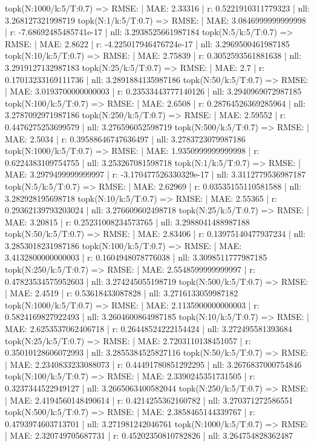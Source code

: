 topk(N:1000/k:5/T:0.7) => RMSE: | MAE: 2.33316 | r: 0.5221910311779323 | nll: 3.268127321998719
topk(N:1/k:5/T:0.7) => RMSE: | MAE: 3.0846999999999998 | r: -7.68692485485741e-17 | nll: 3.2938525661987184
topk(N:5/k:5/T:0.7) => RMSE: | MAE: 2.8622 | r: -4.225017946476724e-17 | nll: 3.2969500461987185
topk(N:10/k:5/T:0.7) => RMSE: | MAE: 2.75839 | r: 0.3052593561881638 | nll: 3.2919127132987183
topk(N:25/k:5/T:0.7) => RMSE: | MAE: 2.7 | r: 0.17013233169111736 | nll: 3.2891884135987186
topk(N:50/k:5/T:0.7) => RMSE: | MAE: 3.0193700000000003 | r: 0.23533443777140126 | nll: 3.2940969072987185
topk(N:100/k:5/T:0.7) => RMSE: | MAE: 2.6508 | r: 0.28764526369285964 | nll: 3.2787092971987186
topk(N:250/k:5/T:0.7) => RMSE: | MAE: 2.59552 | r: 0.4476275253699579 | nll: 3.276596052598719
topk(N:500/k:5/T:0.7) => RMSE: | MAE: 2.5034 | r: 0.39588646747636497 | nll: 3.2783723079987186
topk(N:1000/k:5/T:0.7) => RMSE: | MAE: 1.9350999999999998 | r: 0.6224383109754755 | nll: 3.253267081598718
topk(N:1/k:5/T:0.7) => RMSE: | MAE: 3.2979499999999997 | r: -3.170477526330329e-17 | nll: 3.3112779536987187
topk(N:5/k:5/T:0.7) => RMSE: | MAE: 2.62969 | r: 0.03535155110581588 | nll: 3.282928195698718
topk(N:10/k:5/T:0.7) => RMSE: | MAE: 2.55365 | r: 0.29362139793203024 | nll: 3.276609602498718
topk(N:25/k:5/T:0.7) => RMSE: | MAE: 3.20815 | r: 0.25231008234573765 | nll: 3.2988041488987188
topk(N:50/k:5/T:0.7) => RMSE: | MAE: 2.83406 | r: 0.13975140477937234 | nll: 3.2853018231987186
topk(N:100/k:5/T:0.7) => RMSE: | MAE: 3.4132800000000003 | r: 0.1604948078776038 | nll: 3.3098511777987185
topk(N:250/k:5/T:0.7) => RMSE: | MAE: 2.5548599999999997 | r: 0.47823534575952603 | nll: 3.274245055198719
topk(N:500/k:5/T:0.7) => RMSE: | MAE: 2.4519 | r: 0.53618433087828 | nll: 3.2716133059987182
topk(N:1000/k:5/T:0.7) => RMSE: | MAE: 2.1135900000000003 | r: 0.5824169827922493 | nll: 3.2604600864987185
topk(N:10/k:5/T:0.7) => RMSE: | MAE: 2.6253537062406718 | r: 0.26448524222154424 | nll: 3.272495581393684
topk(N:25/k:5/T:0.7) => RMSE: | MAE: 2.7203110138451057 | r: 0.35010128606072993 | nll: 3.2855384525827116
topk(N:50/k:5/T:0.7) => RMSE: | MAE: 2.2340833233088073 | r: 0.44491780851292295 | nll: 3.2676837000754846
topk(N:100/k:5/T:0.7) => RMSE: | MAE: 2.3390245351731505 | r: 0.3237344522949127 | nll: 3.2665063400582044
topk(N:250/k:5/T:0.7) => RMSE: | MAE: 2.4194560148490614 | r: 0.4214255362160782 | nll: 3.270371272586551
topk(N:500/k:5/T:0.7) => RMSE: | MAE: 2.3858465144339767 | r: 0.4793974603713701 | nll: 3.271981242046761
topk(N:1000/k:5/T:0.7) => RMSE: | MAE: 2.320749705687731 | r: 0.45202350810782826 | nll: 3.264754828362487

